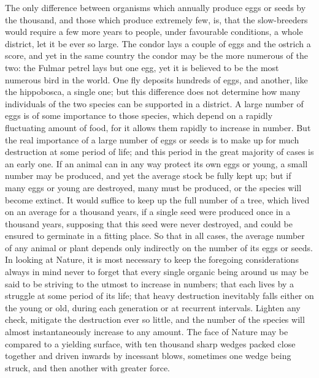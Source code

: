 \indent The only difference between organisms which annually produce eggs or seeds by the thousand, and those which produce extremely few, is, that the slow-breeders would require a few more years to people, under favourable conditions, a whole district, let it be ever so large. The condor lays a couple of eggs and the ostrich a score, and yet in the same country the condor may be the more numerous of the two: the Fulmar petrel lays but one egg, yet it is believed to be the most numerous bird in the world. One fly deposits hundreds of eggs, and another, like the hippobosca, a single one; but this difference does not determine how many individuals of the two species can be supported in a district. A large number of eggs is of some importance to those species, which depend on a rapidly fluctuating amount of food, for it allows them rapidly to increase in number. But the real importance of a large number of eggs or seeds is to make up for much destruction at some period of life; and this period in the great majority of cases is an early one. If an animal can in any way protect its own eggs or young, a small number may be produced, and yet the average stock be fully kept up; but if many eggs or young are destroyed, many must be produced, or the species will become extinct.  It would suffice to keep up the full number of a tree, which lived on an average for a thousand years, if a single seed were produced once in a thousand years, supposing that this seed were never destroyed, and could be ensured to germinate in a fitting place. So that in all cases, the average number of any animal or plant depends only indirectly on the number of its eggs or seeds.\\
\indent In looking at Nature, it is most necessary to keep the foregoing considerations always in mind never to forget that every single organic being around us may be said to be striving to the utmost to increase in numbers; that each lives by a struggle at some period of its life; that heavy destruction inevitably falls either on the young or old, during each generation or at recurrent intervals.  Lighten any check, mitigate the destruction ever so little, and the number of the species will almost instantaneously increase to any amount. The face of Nature may be compared to a yielding surface, with ten thousand sharp wedges packed close together and driven inwards by incessant blows, sometimes one wedge being struck, and then another with greater force.\\
